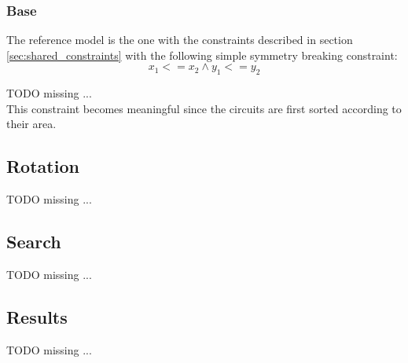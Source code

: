     \subsubsection{Base}
        The reference model is the one with the constraints described in section \ref{sec:shared_constraints}
        with the following simple symmetry breaking constraint:
        \begin{equation}
            x_1 <= x_2 \land y_1 <= y_2
        \end{equation}
        
        \colorbox{BurntOrange}{TODO missing ...} \\
        This constraint becomes meaningful since the circuits are first sorted according to their area.


\subsection{Rotation}
    \colorbox{BurntOrange}{TODO missing ...}


\subsection{Search}
    \colorbox{BurntOrange}{TODO missing ...}


\subsection{Results}
    \colorbox{BurntOrange}{TODO missing ...}


